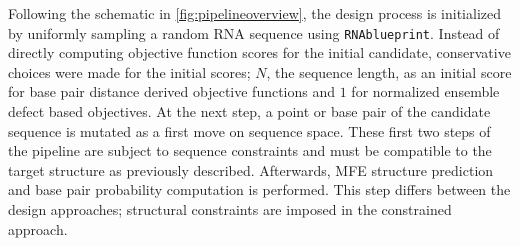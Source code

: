 \documentclass[../../master.tex]{subfiles}
\begin{document}
Following the schematic in \autoref{fig:pipelineoverview}, the design process is initialized by uniformly sampling a random RNA sequence using \texttt{RNAblueprint}.
Instead of directly computing objective function scores for the initial candidate, conservative choices were made for the initial scores; $N$, the sequence length, as an initial score for base pair distance derived objective functions and $1$ for normalized ensemble defect based objectives.
At the next step, a point or base pair of the candidate sequence is mutated as a first move on sequence space.
These first two steps of the pipeline are subject to sequence constraints and must be compatible to the target structure as previously described.
Afterwards, MFE structure prediction and base pair probability computation is performed.
This step differs between the design approaches; structural constraints are imposed in the constrained approach.
\end{document}
